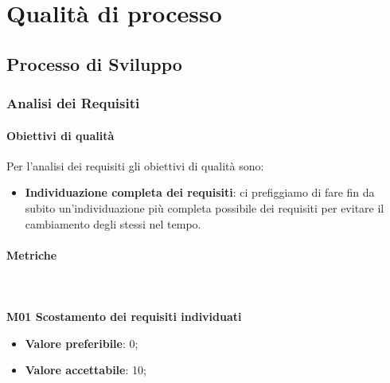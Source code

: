 \section{Qualità di processo}
	\subsection{Processo di Sviluppo}
		\subsubsection{Analisi dei Requisiti} 
			\paragraph{Obiettivi di qualità}
			Per l'analisi dei requisiti gli obiettivi di qualità sono:
			\begin{itemize}
				\item \textbf{Individuazione completa dei requisiti}: ci prefiggiamo di fare fin da subito un'individuazione più completa possibile dei requisiti per evitare il cambiamento degli stessi nel tempo.
			\end{itemize}
			\paragraph{Metriche} \mbox{} \\ \\
				\textbf{M01 Scostamento dei requisiti individuati} 
				\begin{itemize}
					\item \textbf{Valore preferibile}: 0;
					\item \textbf{Valore accettabile}: 10;
				\end{itemize}
			
